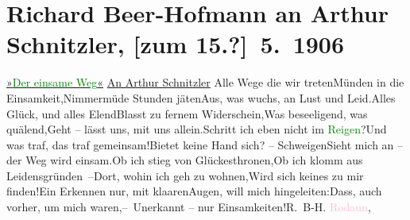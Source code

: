 

               \section[Richard Beer-Hofmann an Arthur Schnitzler, {[}zum 15.?{]} 5. 1906]{ Richard Beer-Hofmann an Arthur Schnitzler, {[}zum
               15.?{]} 5. 1906}\nopagebreak{}\rehead{ }\normalsize\beginnumbering{} \toendnotes[C]{\smallbreak\pagebreak[2]} 
\toendnotes[C]{\smallbreak}\pstart
           \noindent{}\centering{}{\pb}\uline{»\textcolor{green}{Der
                     einsame Weg}{}«}\pend
           \pstart
           \noindent{}\raggedleft{}\uline{An Arthur Schnitzler}\pend
           \stanza{}Alle Wege die wir treten\newverse{}Münden in die Einsamkeit,\newverse{}Nimmermüde Stunden jäten\newverse{}Aus, was wuchs, an Lust und Leid.\newverse{}\newverse{}Alles Glück, und alles Elend\newverse{}Blasst zu fernem Widerschein,\newverse{}Was beseeligend, was quälend,\newverse{}Geht – lässt uns, mit uns allein.\newverse{}\newverse{}Schritt ich eben nicht im \textcolor{green}{Reigen}{}?\newverse{}Und was traf, das traf gemeinsam!\newverse{}Bietet keine Hand sich? – Schweigen\newverse{}Sieht mich an – der Weg wird einsam.\newverse{}\newverse{}Ob ich stieg von Glückesthronen,\newverse{}Ob ich klomm aus Leidensgründen –\newverse{}Dort, wohin ich geh zu wohnen,\newverse{}Wird sich keines zu mir finden!\newverse{}\newverse{}Ein Erkennen nur, mit klaaren\newverse{}Augen, will mich hingeleiten:\newverse{}Dass, auch vorher, um mich waren,\newverse{}– Unerkannt – nur Einsamkeiten!\stanzaend{}\pstart \spacefill\mbox{R. B-H.}\pend{}\pstart
           \textcolor{pink}{Rodaun}{}\ledrightnote{\textcolor{pink}{Rodaun}}, \label{K_L01597_1v}\label{K_L01597_1h}\pend
           \endnumbering{}  
      